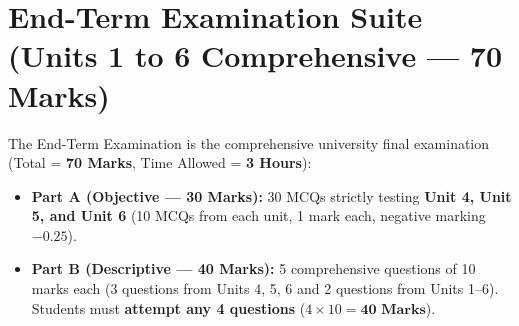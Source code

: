 \documentclass[a4paper,11pt,oneside,openany]{book}
\begin{document}
\newpage



\chapter{End-Term Examination Suite (Units 1 to 6 Comprehensive --- 70 Marks)}
\label{chap:endterm}
\noindent
The End-Term Examination is the comprehensive university final examination (Total = \textbf{70 Marks}, Time Allowed = \textbf{3 Hours}):
\begin{itemize}[leftmargin=8mm]
    \item \textbf{Part A (Objective --- 30 Marks):} 30 MCQs strictly testing \textbf{Unit 4, Unit 5, and Unit 6} (10 MCQs from each unit, 1 mark each, negative marking $-0.25$).
    \item \textbf{Part B (Descriptive --- 40 Marks):} 5 comprehensive questions of 10 marks each (3 questions from Units 4, 5, 6 and 2 questions from Units 1--6). Students must \textbf{attempt any 4 questions} ($4 \times 10 = \mathbf{40\text{ Marks}}$).
\end{itemize}

\newpage


\end{document}
